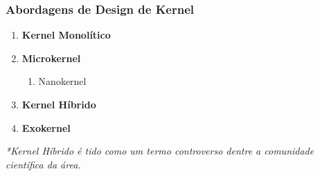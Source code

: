 \documentclass{beamer}
\begin{document}
\begin{frame}[fragile]
\frametitle{Abordagens de Design de Kernel}

\begin{enumerate}
    \vfill \item \textbf{Kernel Monolítico}
    \vfill \item \textbf{Microkernel}
    \begin{enumerate}
        \item Nanokernel
    \end{enumerate}
    \vfill \item \textbf{Kernel Híbrido}
    \vfill \item \textbf{Exokernel}
\end{enumerate}

\vfill \begin{center}
    \textit{*Kernel Híbrido é tido como um termo controverso dentre a comunidade científica da área.}
\end{center}
\end{frame}
\end{document}
